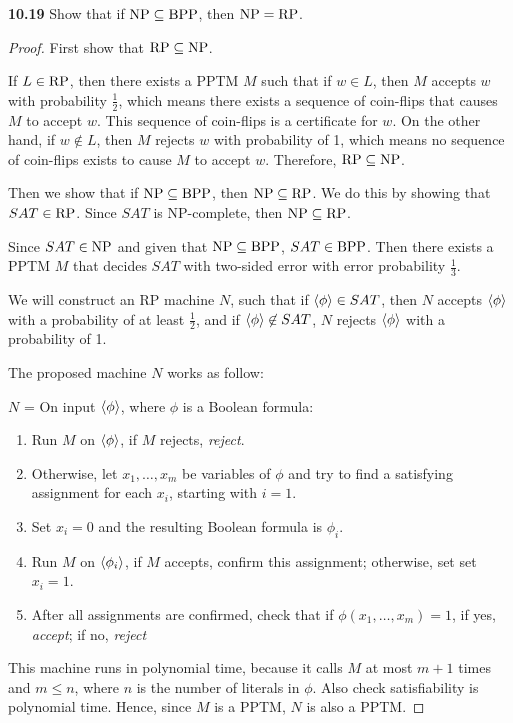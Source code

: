 \textbf{10.19} Show that if $\text{NP} \subseteq \text{BPP}$, then $\text{NP} = \text{RP}$.
\begin{mdframed}
\begin{proof}
First show that $\text{RP} \subseteq \text{NP}$.

If $L \in \text{RP}$, then there exists a PPTM $M$ such that if $w \in L$, then $M$ accepts $w$ with probability $\frac{1}{2}$, which means there exists a sequence of coin-flips that causes $M$ to accept $w$. This sequence of coin-flips is a certificate for $w$. On the other hand, if $w \not \in L$, then $M$ rejects $w$ with probability of 1, which means no sequence of coin-flips exists to cause $M$ to accept $w$. Therefore, $\text{RP} \subseteq \text{NP}$. 

\medskip
Then we show that if $\text{NP} \subseteq \text{BPP}$, then $\text{NP} \subseteq \text{RP}$. We do this by showing that $SAT \in \text{RP}$. Since $SAT$ is NP-complete, then $\text{NP} \subseteq \text{RP}$.

Since $SAT \in \text{NP}$ and given that $\text{NP} \subseteq \text{BPP}$, $SAT \in \text{BPP}$. Then there exists a PPTM $M$ that decides $SAT$ with two-sided error with error probability $\frac{1}{3}$.

We will construct an RP machine $N$, such that if $\langle{\phi}\rangle \in SAT$, then $N$ accepts $\langle{\phi}\rangle$ with a probability of at least $\frac{1}{2}$, and if $\langle{\phi}\rangle \not \in SAT$, $N$ rejects $\langle{\phi}\rangle$ with a probability of 1. 

\medskip
The proposed machine $N$ works as follow:


$N$ = On input $\langle{\phi}\rangle$, where $\phi$ is a Boolean formula:
\begin{enumerate}
\item Run $M$ on $\langle{\phi}\rangle$, if $M$ rejects, \textit{reject}.
\item Otherwise, let $x_1, \ldots, x_m$ be variables of $\phi$ and try to find a satisfying assignment for each $x_i$, starting with $i = 1$.
\item Set $x_i = 0$ and the resulting Boolean formula is $\phi_i$.
\item Run $M$ on $\langle{\phi_i}\rangle$, if $M$ accepts, confirm this assignment; otherwise, set set $x_i = 1$.
\item After all assignments are confirmed, check that if $\phi(x_1, \ldots, x_m) = 1$, if yes, \textit{accept}; if no, \textit{reject}
\end{enumerate}

This machine runs in polynomial time, because it calls $M$ at most $m+1$ times and $m \leq n$, where $n$ is the number of literals in $\phi$. Also check satisfiability is polynomial time. Hence, since $M$ is a PPTM, $N$ is also a PPTM.


\end{proof}
\end{mdframed}

